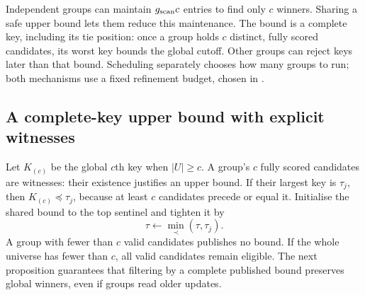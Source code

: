 Independent groups can maintain $g_{\mathrm{scan}} c$ entries to find only $c$
winners. Sharing a safe upper bound lets them reduce this maintenance.
The bound is a complete key, including its tie position: once a group
holds $c$ distinct, fully scored candidates, its worst key bounds the
global cutoff. Other groups can reject keys later than that bound.
Scheduling separately chooses how many groups to run; both mechanisms
use a fixed refinement budget, chosen in .

\subsection{A complete-key upper bound with explicit witnesses}

Let $K_{(c)}$ be the global $c$th key when $|U|\geq c$. A group's
$c$ fully scored candidates are witnesses: their existence justifies an
upper bound. If their largest key is $\tau_j$, then
$K_{(c)}\preceq\tau_j$, because at least $c$ candidates precede or equal
it. Initialise the shared bound to the top sentinel and tighten it by
\begin{equation}
 \tau\leftarrow\min_{\prec}(\tau,\tau_j).
 \label{eq:5-shared-update}
\end{equation}
A group with fewer than $c$ valid candidates publishes no bound. If the
whole universe has fewer than $c$, all valid candidates remain eligible.
The next proposition guarantees that filtering by a complete published
bound preserves global winners, even if groups read older updates.

